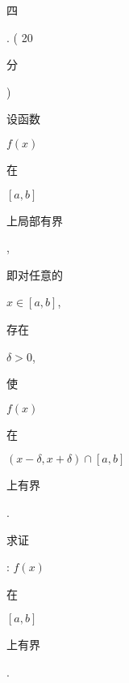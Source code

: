 \documentclass[10pt]{article}
\begin{document}
\begin{CJK}{UTF8}{mj}四\end{CJK}. ( 20 \begin{CJK}{UTF8}{mj}分\end{CJK}) \begin{CJK}{UTF8}{mj}设函数\end{CJK} $f(x)$ \begin{CJK}{UTF8}{mj}在\end{CJK} $[a, b]$ \begin{CJK}{UTF8}{mj}上局部有界\end{CJK}, \begin{CJK}{UTF8}{mj}即对任意的\end{CJK} $x \in[a, b]$, \begin{CJK}{UTF8}{mj}存在\end{CJK} $\delta>0$, \begin{CJK}{UTF8}{mj}使\end{CJK} $f(x)$ \begin{CJK}{UTF8}{mj}在\end{CJK} $(x-\delta, x+\delta) \cap[a, b]$ \begin{CJK}{UTF8}{mj}上有界\end{CJK}. \begin{CJK}{UTF8}{mj}求证\end{CJK}: $f(x)$ \begin{CJK}{UTF8}{mj}在\end{CJK} $[a, b]$ \begin{CJK}{UTF8}{mj}上有界\end{CJK}.
\end{document}
